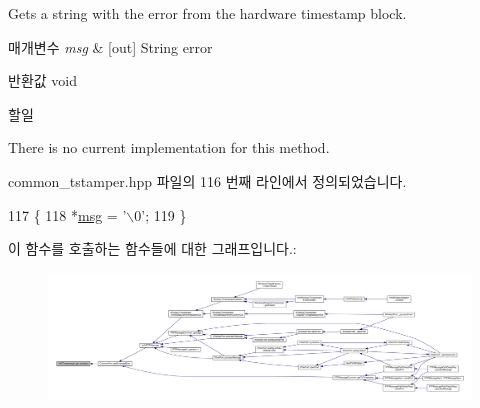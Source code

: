 Gets a string with the error from the hardware timestamp block. 


\begin{DoxyParams}{매개변수}
{\em msg} & \mbox{[}out\mbox{]} String error \\
\hline
\end{DoxyParams}
\begin{DoxyReturn}{반환값}
void 
\end{DoxyReturn}
\begin{DoxyRefDesc}{할일}
\item[\hyperlink{todo__todo000020}{할일}]There is no current implementation for this method. \end{DoxyRefDesc}


common\+\_\+tstamper.\+hpp 파일의 116 번째 라인에서 정의되었습니다.


\begin{DoxyCode}
117     \{
118         *\hyperlink{maap__log__linux_8c_a0c7e58a50354c4a4d6dad428d0e47029}{msg} = \textcolor{charliteral}{'\(\backslash\)0'};
119     \}
\end{DoxyCode}


이 함수를 호출하는 함수들에 대한 그래프입니다.\+:
\nopagebreak
\begin{figure}[H]
\begin{center}
\leavevmode
\includegraphics[width=350pt]{class_common_timestamper_a3b26113436dec73775d2cbc523a6e074_icgraph}
\end{center}
\end{figure}


